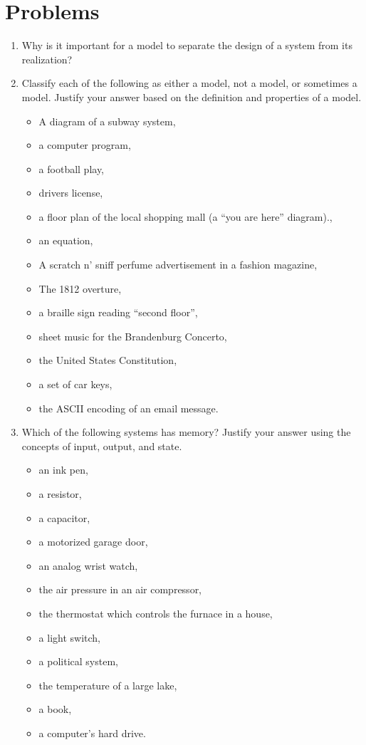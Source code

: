 \section{Problems}
\label{section:behavModelsProblems}

\begin{enumerate}
\def\labelenumi{\arabic{enumi}.}
\item
  Why is it important for a model to separate the design of a system
  from its realization?

\item
  Classify each of the following as either a model, not a model, or
  sometimes a model. Justify your answer based on the definition and
  properties of a model.

\begin{itemize}
\def\labelenumi{\alph{enumi})}
\item A diagram of a subway system,
\item a computer program, 
\item a football play, 
\item drivers license,
\item a floor plan of the local shopping mall (a ``you are here'' diagram)., 
\item an equation, 
\item A scratch n' sniff perfume advertisement in a fashion magazine,
\item The 1812 overture,
\item a braille sign reading ``second floor'',
\item sheet music for the Brandenburg Concerto, 
\item the United States Constitution, 
\item a set of car keys,
\item the ASCII encoding of an email message.
\end{itemize}


  \item
    Which of the following systems has memory? Justify your answer using
    the concepts of input, output, and state.
\begin{itemize}
\def\labelenumi{\alph{enumi})}
\item  an ink pen,
\item a resistor,
\item a capacitor,
\item a motorized garage door,
 \item an analog wrist watch, 
\item the air pressure in an air compressor, 
\item  the thermostat which controls the furnace in a house, 
\item a light switch, 
\item a political system,
\item the temperature of a large lake, 
\item  a book, 
\item a computer's hard drive.
\end{itemize}



\end{enumerate}
